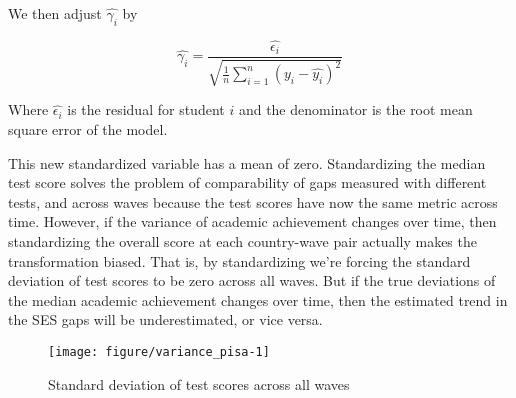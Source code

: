 \documentclass[11pt, a4paper]{article}\usepackage[]{graphicx}\usepackage[]{color}
\begin{document}
We then adjust \begin{math} \hat{\gamma_i} \end{math} by

\begin{equation}
\hat{\gamma_i} = \frac{\hat{\epsilon_i}}{\sqrt{\frac{1}{n} \sum_{i=1}^{n} (y_i - \hat{y_i})^2}}
\end{equation}


Where \begin{math}\hat{\epsilon_i}\end{math} is the residual for student \begin{math}i\end{math} and the denominator is the root mean square error of the model.

This new standardized variable has a mean of zero. Standardizing the median test score solves the problem of comparability of gaps measured with different tests, and across waves because the test scores have now the same metric across time. However, if the variance of academic achievement changes over time, then standardizing the overall score at each country-wave pair actually makes the transformation biased. That is, by standardizing we're forcing the standard deviation of test scores to be zero across all waves. But if the true deviations of the median academic achievement changes over time, then the estimated trend in the SES gaps will be underestimated, or vice versa.

\begin{figure}

{\centering \texttt{[image: figure/variance\_pisa-1]} 

}

\caption[Standard deviation of test scores across all waves]{Standard deviation of test scores across all waves}\label{fig:variance_pisa}
\end{figure}


\end{document}
